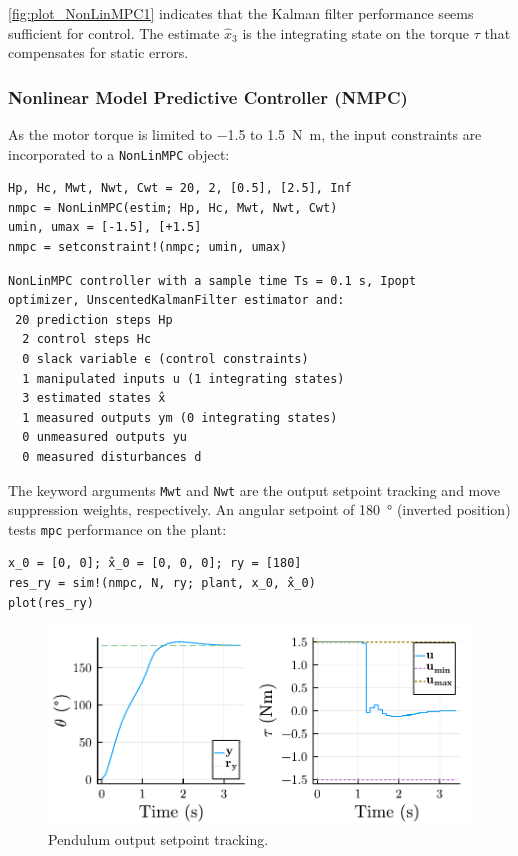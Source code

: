 \cref{fig:plot_NonLinMPC1} indicates that the Kalman filter performance seems sufficient for control. The estimate $\hat{x}_3$ is the integrating state on the torque $\tau$ that compensates for static errors. 

\subsubsection{Nonlinear Model Predictive Controller (NMPC)}

As the motor torque is limited to \num{-1.5} to \SI{1.5}{\newton\meter}, the input constraints are incorporated to a \texttt{NonLinMPC} object:
\begin{verbatim}
Hp, Hc, Mwt, Nwt, Cwt = 20, 2, [0.5], [2.5], Inf
nmpc = NonLinMPC(estim; Hp, Hc, Mwt, Nwt, Cwt)
umin, umax = [-1.5], [+1.5]
nmpc = setconstraint!(nmpc; umin, umax)
\end{verbatim}
\spacerepl
\begin{verbatim}
NonLinMPC controller with a sample time Ts = 0.1 s, Ipopt
optimizer, UnscentedKalmanFilter estimator and:
 20 prediction steps Hp
  2 control steps Hc
  0 slack variable ϵ (control constraints)
  1 manipulated inputs u (1 integrating states)
  3 estimated states x̂
  1 measured outputs ym (0 integrating states)
  0 unmeasured outputs yu
  0 measured disturbances d
\end{verbatim}

The keyword arguments \texttt{Mwt} and \texttt{Nwt} are the output setpoint tracking and move suppression weights, respectively. An angular setpoint of \SI{180}{\degree} (inverted position) tests \texttt{mpc} performance on the plant:
\begin{verbatim}
x_0 = [0, 0]; x̂_0 = [0, 0, 0]; ry = [180]
res_ry = sim!(nmpc, N, ry; plant, x_0, x̂_0)
plot(res_ry)
\end{verbatim}

\begin{figure}[h]
    \centering
    \includegraphics[width=\columnwidth]{fig/plot_NonLinMPC2.pdf}
    \caption{Pendulum output setpoint tracking.}
    \label{fig:plot_NonLinMPC2}
\end{figure}

